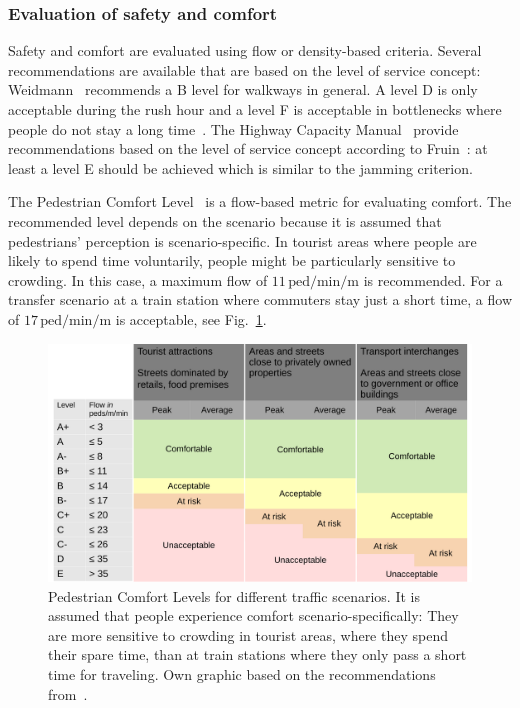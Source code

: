 \subsubsection{Evaluation of safety and comfort}
\label{sec:risk}

Safety and comfort are evaluated using flow or density-based criteria. Several recommendations are available that are based on the level of service concept: Weidmann~\cite{weidmann-1994-cdyn} recommends a B level for walkways in general. A level D is only acceptable during the rush hour  and a level F is acceptable in bottlenecks where people do not stay a long time~\cite{weidmann-1994-cdyn}. The Highway Capacity Manual~\cite{hpc-2022-cdyn} provide recommendations based on the level of service concept according to Fruin~\cite{fruin-1971-cdyn}: at least a level E should be achieved which is similar to the jamming criterion.

The Pedestrian Comfort Level~\cite{tfl-2019-cdyn} is a flow-based metric for evaluating comfort.
The recommended level depends on the scenario because it is assumed that pedestrians' perception is scenario-specific. In tourist areas where people are likely to spend time voluntarily, people might be particularly sensitive to crowding. In this case, a maximum flow of $11\,\text{ped/min/m}$ is recommended. For a transfer scenario at a train station where commuters stay just a short time, a flow of  $17\,\text{ped/min/m}$ is acceptable, see Fig.~\ref{fig:pedcomfortlevel}.




\begin{figure}[hbt!]
\centering
\includegraphics[width=12.5cm]{../figures/state-of-the-art/crowdmanagement/pcl.pdf} 
\caption[Pedestrian Comfort Levels for different traffic scenarios]{Pedestrian Comfort Levels for different traffic scenarios. It is assumed that people experience comfort scenario-specifically: They are more sensitive to crowding in tourist areas, where they spend their spare time, than at train stations where they only pass a short time for traveling. Own graphic based on the recommendations from~\cite{tfl-2019-cdyn}.}
\label{fig:pedcomfortlevel}
\end{figure}




